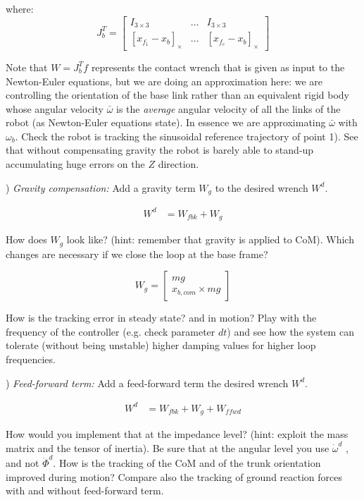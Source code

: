 \documentclass{report}
\newcommand{\mat}[1]{\ensuremath{\begin{bmatrix}#1\end{bmatrix}}}	%
\begin{document}
where:
\begin{equation}
J_b^T = \mat{I_{3\times3} & \dots & I_{3\times3} \\
			[x_{f_1} - x_b]_{\times} & \dots & [x_{f_c} - x_b]_{\times}}
\label{eq:newton-euler}
\end{equation}


Note that $W = J_b^Tf$ represents the contact wrench that is given as input to the Newton-Euler equations, but we are doing an approximation here: we are controlling the orientation of the base link rather than an equivalent rigid body whose angular velocity $\bar{\omega}$ is the \textit{average} angular velocity of all the links of the robot (as Newton-Euler equations state). In essence we are approximating  $\bar{\omega}$ with ${\omega}_b$.
Check the robot is tracking the sinusoidal reference trajectory of point 1). 
See that without compensating gravity the robot is barely able to stand-up accumulating huge errors on the $Z$ direction.

) \textit{Gravity compensation:}
Add a gravity term $W_g$ to the desired wrench $W^d$.

\begin{align}
W^d &= W_{fbk} +  W_g
\end{align}

How does $W_g$ look like? (hint: remember that gravity is applied to CoM). Which changes are necessary if we close the loop at the base frame?

\begin{equation}
W_g = \mat{mg \\ x_{b,com} \times mg}
\end{equation}

How is the tracking error in steady state? and in motion? 
Play with the frequency of the controller (e.g. check parameter $dt$) and see how the system can tolerate (without being unstable)  higher damping values for higher loop frequencies.


) \textit{Feed-forward term:}
Add a feed-forward term the desired wrench $W^d$. 

\begin{align}
W^d &= W_{fbk} +  W_g + W_{ffwd}
\end{align}

How would you implement that at the impedance level? (hint: exploit the mass matrix and the tensor of inertia). Be sure that at the angular level you use $\dot{\omega}^d$ , and not $\ddot{\Phi}^d$.
How is the tracking of the CoM and of the trunk orientation improved during motion? 
Compare also the tracking of ground reaction  forces with and without feed-forward term.
\end{document}
